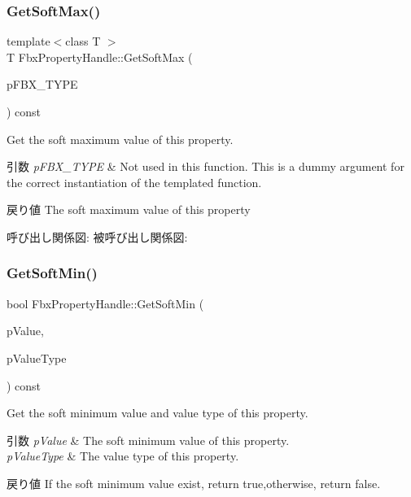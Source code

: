 \subsubsection{\texorpdfstring{Get\+Soft\+Max()}{GetSoftMax()}\hspace{0.1cm}{\footnotesize\ttfamily [2/2]}}
{\footnotesize\ttfamily template$<$class T $>$ \\
T Fbx\+Property\+Handle\+::\+Get\+Soft\+Max (\begin{DoxyParamCaption}\item[{const T $\ast$}]{p\+F\+B\+X\+\_\+\+T\+Y\+PE }\end{DoxyParamCaption}) const}

Get the soft maximum value of this property. 
\begin{DoxyParams}{引数}
{\em p\+F\+B\+X\+\_\+\+T\+Y\+PE} & Not used in this function. This is a dummy argument for the correct instantiation of the templated function. \\
\hline
\end{DoxyParams}
\begin{DoxyReturn}{戻り値}
The soft maximum value of this property 
\end{DoxyReturn}
呼び出し関係図\+:
被呼び出し関係図\+:
\mbox{\label{class_fbx_property_handle_a879e886ad129d780a9343def15bead82}} 
\subsubsection{\texorpdfstring{Get\+Soft\+Min()}{GetSoftMin()}\hspace{0.1cm}{\footnotesize\ttfamily [1/2]}}
{\footnotesize\ttfamily bool Fbx\+Property\+Handle\+::\+Get\+Soft\+Min (\begin{DoxyParamCaption}\item[{void $\ast$}]{p\+Value,  }\item[{\hyperlink{fbxpropertytypes_8h_a73913a5ddfb20e57c6f25e9e6784bd92}{E\+Fbx\+Type}}]{p\+Value\+Type }\end{DoxyParamCaption}) const}

Get the soft minimum value and value type of this property. 
\begin{DoxyParams}{引数}
{\em p\+Value} & The soft minimum value of this property. \\
\hline
{\em p\+Value\+Type} & The value type of this property. \\
\hline
\end{DoxyParams}
\begin{DoxyReturn}{戻り値}
If the soft minimum value exist, return true,otherwise, return false. 
\end{DoxyReturn}
\mbox{\label{class_fbx_property_handle_a1f2a64b0088928db88a25dccb7c7d190}} 
